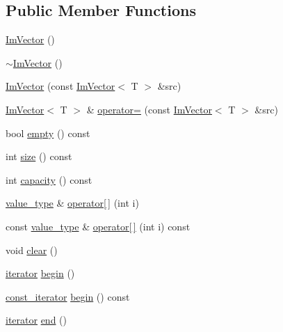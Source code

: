 \subsection*{Public Member Functions}
\begin{DoxyCompactItemize}
\item 
\mbox{\hyperlink{class_im_vector_a547fff373659fd848c3ecc6b25a83f25}{Im\+Vector}} ()
\item 
\mbox{\hyperlink{class_im_vector_a9b782359ca26eaa1a6a6138fcf341c54}{$\sim$\+Im\+Vector}} ()
\item 
\mbox{\hyperlink{class_im_vector_a6e2ee59d8b2fa1583617a2110a56aed4}{Im\+Vector}} (const \mbox{\hyperlink{class_im_vector}{Im\+Vector}}$<$ T $>$ \&src)
\item 
\mbox{\hyperlink{class_im_vector}{Im\+Vector}}$<$ T $>$ \& \mbox{\hyperlink{class_im_vector_a0d795963a9fd9d15833fdf87ba292438}{operator=}} (const \mbox{\hyperlink{class_im_vector}{Im\+Vector}}$<$ T $>$ \&src)
\item 
bool \mbox{\hyperlink{class_im_vector_aa53e48a5272f4bad1099368769514ff1}{empty}} () const
\item 
int \mbox{\hyperlink{class_im_vector_a8c903ecb1aaee0601b6a8ad835a4a435}{size}} () const
\item 
int \mbox{\hyperlink{class_im_vector_ac17681baa8b9b5cd97e556da29f9ef73}{capacity}} () const
\item 
\mbox{\hyperlink{class_im_vector_a8bd77e4e7581d8e5f9e98d7c2f3c2a80}{value\+\_\+type}} \& \mbox{\hyperlink{class_im_vector_a59a3eeadda07579727de93ca6844b91e}{operator\mbox{[}$\,$\mbox{]}}} (int i)
\item 
const \mbox{\hyperlink{class_im_vector_a8bd77e4e7581d8e5f9e98d7c2f3c2a80}{value\+\_\+type}} \& \mbox{\hyperlink{class_im_vector_ab97c3f6f1943602e36afb593c6f03ff1}{operator\mbox{[}$\,$\mbox{]}}} (int i) const
\item 
void \mbox{\hyperlink{class_im_vector_ae2d401b4ec5f1113cdb8edb5a61a38f7}{clear}} ()
\item 
\mbox{\hyperlink{class_im_vector_a74b5478f1f6fd471cc71219bce483db6}{iterator}} \mbox{\hyperlink{class_im_vector_a300a8b559cd87a78063046ef81151bce}{begin}} ()
\item 
\mbox{\hyperlink{class_im_vector_aedeac9c5080f9d6ce96ae837768ee4c4}{const\+\_\+iterator}} \mbox{\hyperlink{class_im_vector_ac72cd4105b5c6a7f76157df945b39d4c}{begin}} () const
\item 
\mbox{\hyperlink{class_im_vector_a74b5478f1f6fd471cc71219bce483db6}{iterator}} \mbox{\hyperlink{class_im_vector_a947fbc3b1d8c1997e51ae6caab440379}{end}} ()

\end{DoxyCompactItemize}
